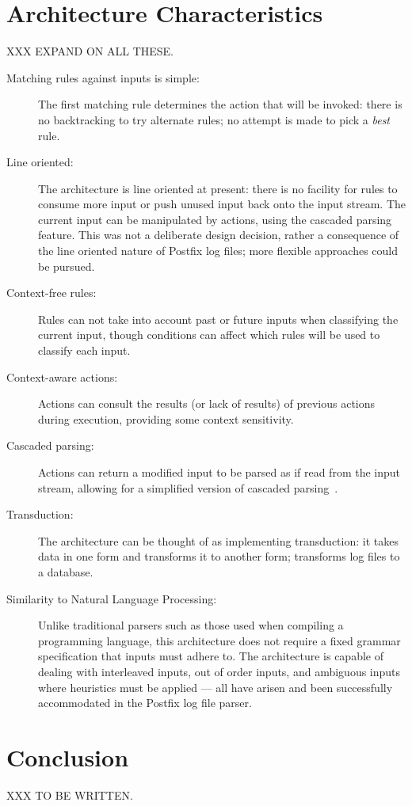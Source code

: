 \section{Architecture Characteristics}

\label{Architecture characteristics}

XXX EXPAND ON ALL THESE\@.

\begin{description}

    \item [Matching rules against inputs is simple:]  The first matching
        rule determines the action that will be invoked: there is no
        backtracking to try alternate rules; no attempt is made to pick a
        \textit{best\/} rule.

    \item [Line oriented:]  The architecture is line oriented at present:
        there is no facility for rules to consume more input or push unused
        input back onto the input stream.  The current input can be
        manipulated by actions, using the cascaded parsing feature.  This
        was not a deliberate design decision, rather a consequence of the
        line oriented nature of Postfix log files; more flexible approaches
        could be pursued.

    \item [Context-free rules:]  Rules can not take into account past or
        future inputs when classifying the current input, though conditions
        can affect which rules will be used to classify each input.

    \item [Context-aware actions:] Actions can consult the results (or lack
        of results) of previous actions during execution, providing some
        context sensitivity.

    \item [Cascaded parsing:] Actions can return a modified input to be
        parsed as if read from the input stream, allowing for a simplified
        version of cascaded parsing~\cite{cascaded-parsing}.

    \item [Transduction:]  The architecture can be thought of as
        implementing transduction: it takes data in one form
        and transforms it to another form; \parsername{} transforms log
        files to a database.

    \item [Similarity to Natural Language Processing:] Unlike traditional
        parsers such as those used when compiling a programming language,
        this architecture does not require a fixed grammar specification
        that inputs must adhere to.  The architecture is capable of dealing
        with interleaved inputs, out of order inputs, and ambiguous inputs
        where heuristics must be applied --- all have arisen and been
        successfully accommodated in the Postfix log file parser.

\end{description}


\section{Conclusion}

XXX TO BE WRITTEN\@.
